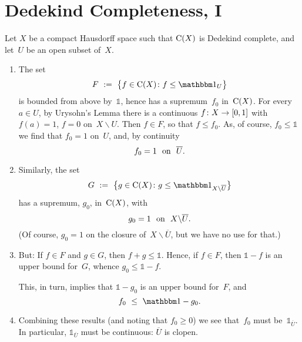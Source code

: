 \documentclass[main.tex]{subfiles}
\begin{document}
\section{Dedekind Completeness, I}
\begin{psec}{6.1}%
Let $X$ be a compact Hausdorff space
such that $\mathrm{C}(X)$ is Dedekind complete,
and let~$U$ be an open subset of~$X$.
\begin{enumerate}
\item\label{6.1-1}
The set
\begin{equation*}
F\ :=\ \bigl\{ f\in \Cont{X}\colon f\leq\mathbb{1}_U \bigr\}
\end{equation*}
is bounded from above by~$\mathbb{1}$,
hence has a supremum~$f_0$ in~$\mathrm{C}(X)$.
For every $a\in U$,
by Urysohn's Lemma
there is a continuous $f\colon X\rightarrow [0,1]$
with $f(a)=1$, $f=0$ on~$X\backslash U$.
Then $f\in F$, so that $f\leq f_0$.
As, of course, $f_0\leq \mathbb{1}$
we find that $f_0=1$ on~$U$,
and, by continuity
\begin{equation*}
f_0=1\ \htam{ on }\ \overline{U}\htam{.}
\end{equation*}
%
\item\label{6.1-2}
Similarly, the set
\begin{equation*}
G\ :=\ \bigl\{g\in\Cont{X}\colon
 g\leq \mathbb{1}_{X\backslash\overline{U}} \bigr\}
\end{equation*}
has a supremum, $g_0$, in~$\mathrm{C}(X)$, with
\begin{equation*}
g_0=1\ \htam{ on }\ X\backslash\overline{U}\htam{.}
\end{equation*}
(Of course, $g_0=1$ on the closure of~$X\backslash \overline U$,
but we have no use for that.)
%
\item\label{6.1-3}
But:
If $f\in F$ and $g\in G$,
then $f+g\leq \mathbb{1}$.
Hence,
if $f\in F$,
then $\mathbb 1-f$ is an upper bound for~$G$,
whence $g_0\leq\mathbb 1-f$.

This, in turn,
implies that $\mathbb 1-g_0$ is an upper bound for~$F$, and
\begin{equation*}
f_0\ \leq\ \mathbb 1-g_0\htam{.}
\end{equation*}
%
\item\label{6.1-4}
Combining these results
(and noting that $f_0\geq 0$)
we see that~$f_0$ must be~${\mathbb 1}_{\overline U}$.
In particular,
$\mathbb{1}_{\overline U}$ must be continuous:
$\overline U$ is clopen.
\end{enumerate}
\end{psec}
%
\end{document}
